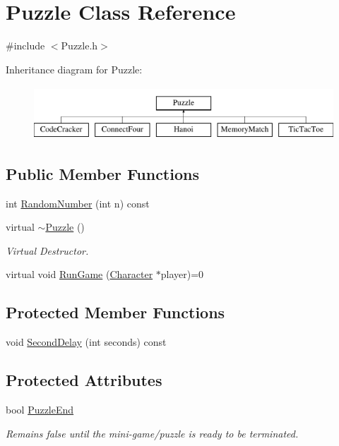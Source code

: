 \hypertarget{classPuzzle}{\section{Puzzle Class Reference}
\label{classPuzzle}
}


{\ttfamily \#include $<$Puzzle.\-h$>$}

Inheritance diagram for Puzzle\-:\begin{figure}[H]
\begin{center}
\leavevmode
\includegraphics[height=2.000000cm]{classPuzzle}
\end{center}
\end{figure}
\subsection*{Public Member Functions}
\begin{DoxyCompactItemize}
\item 
int \hyperlink{classPuzzle_ad0be5c887460d0b386bf5d97264f0c24}{Random\-Number} (int n) const 
\item 
virtual \hyperlink{classPuzzle_a4319df1536a07cd1aaf23b27aeb53579}{$\sim$\-Puzzle} ()
\begin{DoxyCompactList}\small\item\em Virtual Destructor. \end{DoxyCompactList}\item 
virtual void \hyperlink{classPuzzle_a134875b96b18d9963d2b018fd14e7ab9}{Run\-Game} (\hyperlink{classCharacter}{Character} $\ast$player)=0
\end{DoxyCompactItemize}
\subsection*{Protected Member Functions}
\begin{DoxyCompactItemize}
\item 
void \hyperlink{classPuzzle_ac25f8ddec23bc739d3e3ca8738316d8a}{Second\-Delay} (int seconds) const 
\end{DoxyCompactItemize}
\subsection*{Protected Attributes}
\begin{DoxyCompactItemize}
\item 
bool \hyperlink{classPuzzle_a965ad54e9f7340c3cad944fc82c61a2b}{Puzzle\-End}
\begin{DoxyCompactList}\small\item\em Remains false until the mini-\/game/puzzle is ready to be terminated. \end{DoxyCompactList}\end{DoxyCompactItemize}


